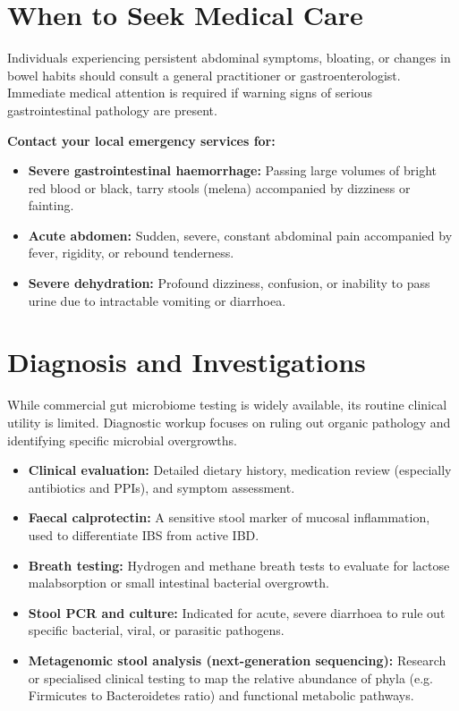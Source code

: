 \section*{When to Seek Medical Care}
Individuals experiencing persistent abdominal symptoms, bloating, or changes in bowel habits should consult a general practitioner or gastroenterologist. Immediate medical attention is required if warning signs of serious gastrointestinal pathology are present.

\textbf{Contact your local emergency services for:}
\begin{itemize}
    \item \textbf{Severe gastrointestinal haemorrhage:} Passing large volumes of bright red blood or black, tarry stools (melena) accompanied by dizziness or fainting.
    \item \textbf{Acute abdomen:} Sudden, severe, constant abdominal pain accompanied by fever, rigidity, or rebound tenderness.
    \item \textbf{Severe dehydration:} Profound dizziness, confusion, or inability to pass urine due to intractable vomiting or diarrhoea.
\end{itemize}

\section*{Diagnosis and Investigations}
While commercial gut microbiome testing is widely available, its routine clinical utility is limited. Diagnostic workup focuses on ruling out organic pathology and identifying specific microbial overgrowths.
\begin{itemize}
    \item \textbf{Clinical evaluation:} Detailed dietary history, medication review (especially antibiotics and PPIs), and symptom assessment.
    \item \textbf{Faecal calprotectin:} A sensitive stool marker of mucosal inflammation, used to differentiate IBS from active IBD.
    \item \textbf{Breath testing:} Hydrogen and methane breath tests to evaluate for lactose malabsorption or small intestinal bacterial overgrowth.
    \item \textbf{Stool PCR and culture:} Indicated for acute, severe diarrhoea to rule out specific bacterial, viral, or parasitic pathogens.
    \item \textbf{Metagenomic stool analysis (next-generation sequencing):} Research or specialised clinical testing to map the relative abundance of phyla (e.g. Firmicutes to Bacteroidetes ratio) and functional metabolic pathways.
\end{itemize}

